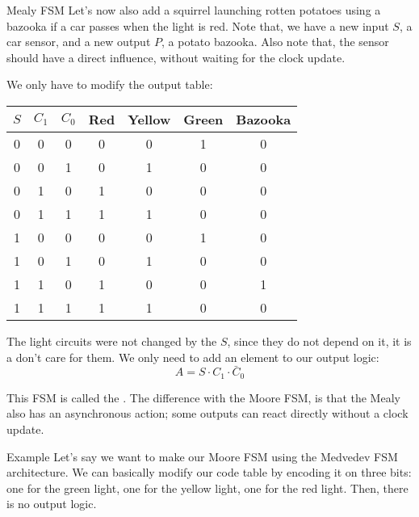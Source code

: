 \documentclass[a4paper]{article}
\begin{document}
\begin{parag}{Mealy FSM}
    Let's now also add a squirrel launching rotten potatoes using a bazooka if a car passes when the light is red. Note that, we have a new input $S$, a car sensor, and a new output $P$, a potato bazooka. Also note that, the sensor should have a direct influence, without waiting for the clock update.


    We only have to modify the output table:
    \begin{center}
    \begin{tabular}{ccc|cccc}
        $S$ & $C_1$ & $C_0$ & Red & Yellow & Green & Bazooka\\
        \hline
        0 & 0 & 0 & 0 & 0 & 1 & 0 \\
        0 & 0 & 1 & 0 & 1 & 0 & 0 \\
        0 & 1 & 0 & 1 & 0 & 0 & 0 \\
        0 & 1 & 1 & 1 & 1 & 0 & 0 \\
        1 & 0 & 0 & 0 & 0 & 1 & 0 \\
        1 & 0 & 1 & 0 & 1 & 0 & 0 \\
        1 & 1 & 0 & 1 & 0 & 0 & 1 \\
        1 & 1 & 1 & 1 & 1 & 0 & 0 \\
    \end{tabular}
    \end{center}

    The light circuits were not changed by the $S$, since they do not depend on it, it is a don't care for them. We only need to add an element to our output logic: 
    \[A = S \cdot C_1 \cdot \bar{C}_0\]
    
    This FSM is called the . The difference with the Moore FSM, is that the Mealy also has an asynchronous action; some outputs can react directly without a clock update.
\end{parag}

\begin{parag}{Example}
    Let's say we want to make our Moore FSM using the Medvedev FSM architecture. We can basically modify our code table by encoding it on three bits: one for the green light, one for the yellow light, one for the red light. Then, there is no output logic.
\end{parag}
\end{document}
